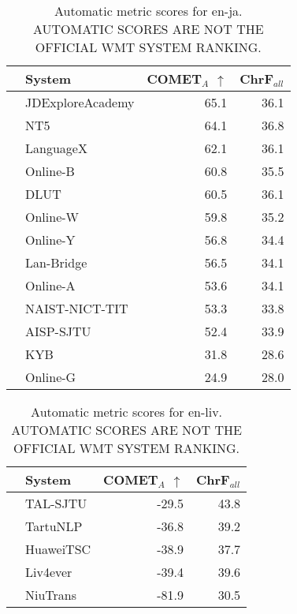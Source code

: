 \begin{table}
\centering
\caption{Automatic metric scores for en-ja. \\AUTOMATIC SCORES ARE NOT THE OFFICIAL WMT SYSTEM RANKING.}
\begin{tabular}{llrr}
\toprule
          &            System &  COMET$_{A}$ $\uparrow$ &  ChrF$_{all}$ \\
\midrule
 \Const{} &  JDExploreAcademy &                    65.1 &          36.1 \\
 \Const{} &               NT5 &                    64.1 &          36.8 \\
 \Uncon{} &         LanguageX &                    62.1 &          36.1 \\
 \Uncon{} &          Online-B &                    60.8 &          35.5 \\
 \Const{} &              DLUT &                    60.5 &          36.1 \\
 \Uncon{} &          Online-W &                    59.8 &          35.2 \\
 \Uncon{} &          Online-Y &                    56.8 &          34.4 \\
 \Uncon{} &        Lan-Bridge &                    56.5 &          34.1 \\
 \Uncon{} &          Online-A &                    53.6 &          34.1 \\
 \Const{} &    NAIST-NICT-TIT &                    53.3 &          33.8 \\
 \Const{} &         AISP-SJTU &                    52.4 &          33.9 \\
 \Const{} &               KYB &                    31.8 &          28.6 \\
 \Uncon{} &          Online-G &                    24.9 &          28.0 \\
\bottomrule
\end{tabular}
\end{table}



\begin{table}
\centering
\caption{Automatic metric scores for en-liv. \\AUTOMATIC SCORES ARE NOT THE OFFICIAL WMT SYSTEM RANKING.}
\begin{tabular}{llrr}
\toprule
          &     System &  COMET$_{A}$ $\uparrow$ &  ChrF$_{all}$ \\
\midrule
 \Uncon{} &   TAL-SJTU &                   -29.5 &          43.8 \\
 \Uncon{} &   TartuNLP &                   -36.8 &          39.2 \\
 \Uncon{} &  HuaweiTSC &                   -38.9 &          37.7 \\
 \Uncon{} &   Liv4ever &                   -39.4 &          39.6 \\
 \Const{} &   NiuTrans &                   -81.9 &          30.5 \\
\bottomrule
\end{tabular}
\end{table}



